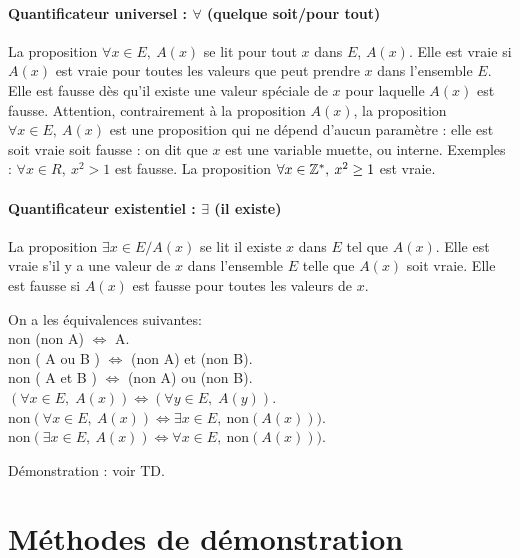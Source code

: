 {\paragraph{Quantificateur universel : $\forall$ (quelque soit/pour tout)}

La proposition \og$\forall x\in E,\:A(x)$\fg{} se lit \og pour tout $x$ dans $E$, $A(x)$\fg. Elle est vraie si $A(x)$ est vraie pour toutes les valeurs que peut prendre $x$ dans l'ensemble $E$. Elle est fausse dès qu'il existe une valeur spéciale de $x$ pour laquelle $A(x)$ est fausse.
Attention, contrairement à la proposition $A(x)$, la proposition $\forall x\in E,\:A(x)$ est une proposition qui ne dépend d'aucun paramètre : elle est soit vraie soit fausse : on dit que $x$ est une variable muette, ou interne.
Exemples :  $\forall x\in R,\: x^2>1$ est fausse. La proposition $\forall x\in \mathbb{Z}^*,\: x^2\geq 1$ est vraie.

\paragraph{Quantificateur existentiel : $\exists$ (il existe)}


La proposition \og$\exists x\in E\slash A(x)$\fg{} se lit \og il existe $x$ dans $E$ tel que $A(x)$\fg. Elle est vraie s'il y a une valeur de $x$ dans l'ensemble $E$ telle que $A(x)$ soit vraie. Elle est fausse si $A(x)$ est fausse pour toutes les valeurs de $x$.



\begin{theoreme} On a les équivalences suivantes:\\
non (non A) $\Leftrightarrow$ A.\\
non ( A ou B ) $\Leftrightarrow$ (non A) et (non B).\\
non ( A et B ) $\Leftrightarrow$ (non A) ou (non B).\\
$(\forall x\in E,\; A(x))\Leftrightarrow (\forall y\in E,\; A(y))$.\\
$\text{non}(\forall x\in E,\: A(x)) \Leftrightarrow \exists x\in E,\: \text{non}(A(x)))$.\\
$\text{non}(\exists x\in E,\: A(x)) \Leftrightarrow \forall x\in E,\: \text{non}(A(x)))$.
\end{theoreme}

Démonstration : voir TD.

\section{Méthodes de démonstration}


}
